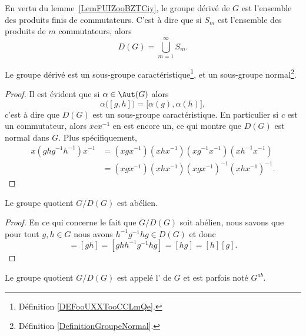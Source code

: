 En vertu du lemme~\ref{LemFUIZooBZTCiy}, le groupe dérivé de \( G\) est l'ensemble des produits finis de commutateurs. C'est à dire que si \( S_m\) est l'ensemble des produits de \( m\) commutateurs, alors
\begin{equation}
    D(G)=\bigcup_{m=1}^{\infty}S_m.
\end{equation}

\begin{lemma}   \label{LemMMOCooDJJJhy}
    Le groupe dérivé est un sous-groupe caractéristique\footnote{Définition \ref{DEFooUXXTooCCLmQe}.}, et un sous-groupe normal\footnote{Définition \ref{DefinitionGroupeNormal}.}.
\end{lemma}

\begin{proof}
    Il est évident que si \( \alpha\in\Aut(G)\) alors
    \begin{equation}
        \alpha\big( [g,h] \big)=\big[ \alpha(g),\alpha(h) \big],
    \end{equation}
    c'est à dire que \( D(G)\) est un sous-groupe caractéristique. En particulier si \( c\) est un commutateur, alors \( xcx^{-1}\) en est encore un, ce qui montre que \( D(G)\) est normal dans \( G\). Plus spécifiquement,
    \begin{subequations}
        \begin{align}
        x(ghg^{-1}h^{-1})x^{-1}&=(xgx^{-1})(xhx^{-1})(xg^{-1}x^{-1})(xh^{-1}x^{-1})\\
        &=(xgx^{-1})(xhx^{-1})(xgx^{-1})^{-1}(xhx^{-1})^{-1}.
        \end{align}
    \end{subequations}
\end{proof}

\begin{proposition}\label{PropAPRGooHBkELf}
    Le groupe quotient \( G/D(G)\) est abélien.
\end{proposition}

\begin{proof}
    En ce qui concerne le fait que \( G/D(G)\) soit abélien, nous savons que pour tout \( g,h\in G\) nous avons \( h^{-1}g^{-1}hg\in D(G)\) et donc
    \begin{equation}
        [g][h]=[gh]=[ghh^{-1}g^{-1}hg]=[hg]=[h][g].
    \end{equation}
\end{proof}

Le groupe quotient \( G/D(G)\) est appelé l' de \( G\) et est parfois noté \( G^{ab}\).

